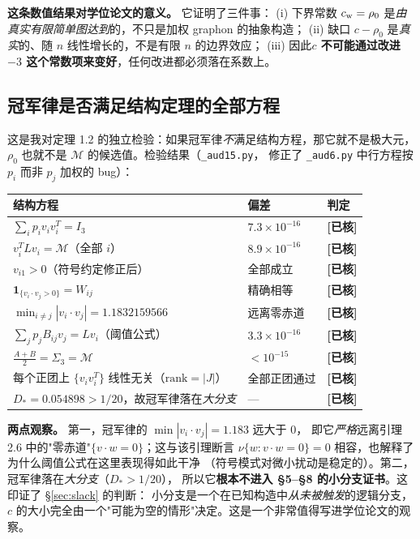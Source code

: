 \documentclass[UTF8,11pt]{ctexart}
\theoremstyle{definition}
\newcommand{\chk}{\textcolor[rgb]{0.05,0.25,0.55}{\bfseries [已核]}}
\begin{document}
\textbf{这条数值结果对学位论文的意义。} 它证明了三件事：
(i) 下界常数 $c_{\rm w}=\rho_0$ 是\emph{由真实有限简单图达到}的，不只是加权 graphon 的抽象构造；
(ii) 缺口 $c-\rho_0$ 是\emph{真实}的、随 $n$ 线性增长的，不是有限 $n$ 的边界效应；
(iii) 因此\textbf{$c$ 不可能通过改进 $-3$ 这个常数项来变好}，任何改进都必须落在系数上。

\subsection{冠军律是否满足结构定理的全部方程}

这是我对定理 1.2 的独立检验：如果冠军律\emph{不}满足结构方程，那它就不是极大元，
$\rho_0$ 也就不是 $\mathcal M$ 的候选值。检验结果（\texttt{\_aud15.py}，
修正了 \texttt{\_aud6.py} 中行方程按 $p_i$ 而非 $p_j$ 加权的 bug）：
\begin{center}
\small
\begin{tabular}{lll}
\toprule
结构方程 & 偏差 & 判定\\
\midrule
$\sum_ip_iv_iv_i^T=I_3$ & $7.3\times10^{-16}$ & \chk\\
$v_i^TLv_i=\mathcal M$（全部 $i$） & $8.9\times10^{-16}$ & \chk\\
$v_{i1}>0$（符号约定修正后） & 全部成立 & \chk\\
$\mathbf1_{\{v_i\cdot v_j>0\}}=W_{ij}$ & 精确相等 & \chk\\
$\min_{i\ne j}|v_i\cdot v_j|=1.1832159566$ & 远离零赤道 & \chk\\
$\sum_jp_jB_{ij}v_j=Lv_i$（阈值公式） & $3.3\times10^{-16}$ & \chk\\
$\frac{A+B}2=\Sigma_3=\mathcal M$ & $<10^{-15}$ & \chk\\
每个正团上 $\{v_iv_i^T\}$ 线性无关（$\mathrm{rank}=|J|$） & 全部正团通过 & \chk\\
$D_*=0.054898>1/20$，故冠军律落在\emph{大分支} & — & \chk\\
\bottomrule
\end{tabular}
\end{center}

\noindent\textbf{两点观察。} 第一，冠军律的 $\min|v_i\cdot v_j|=1.183$ 远大于 $0$，
即它\emph{严格}远离引理 2.6 中的"零赤道"$\{v\cdot w=0\}$；这与该引理断言
$\nu\{w:v\cdot w=0\}=0$ 相容，也解释了为什么阈值公式在这里表现得如此干净
（符号模式对微小扰动是稳定的）。第二，冠军律落在\emph{大分支}（$D_*>1/20$），
所以它\textbf{根本不进入 \S5--\S8 的小分支证书}。这印证了 \S\ref{sec:slack} 的判断：
小分支是一个在已知构造中\emph{从未被触发}的逻辑分支，
$c$ 的大小完全由一个"可能为空的情形"决定。这是一个非常值得写进学位论文的观察。
\end{document}
